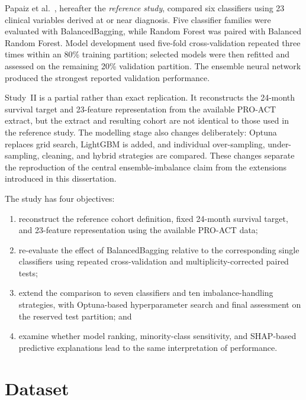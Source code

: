 Papaiz et al.~\cite{Papaiz2024}, hereafter the \emph{reference study}, compared six classifiers using 23 clinical variables derived at or near diagnosis.
Five classifier families were evaluated with BalancedBagging, while Random Forest was paired with Balanced Random Forest.
Model development used five-fold cross-validation repeated three times within an 80\% training partition; selected models were then refitted and assessed on the remaining 20\% validation partition.
The ensemble neural network produced the strongest reported validation performance.

Study~II is a partial rather than exact replication.
It reconstructs the 24-month survival target and 23-feature representation from the available \gls{PRO-ACT} extract, but the extract and resulting cohort are not identical to those used in the reference study.
The modelling stage also changes deliberately: Optuna replaces grid search, LightGBM is added, and individual over-sampling, under-sampling, cleaning, and hybrid strategies are compared.
These changes separate the reproduction of the central ensemble-imbalance claim from the extensions introduced in this dissertation.

The study has four objectives:
\begin{enumerate}
  \item reconstruct the reference cohort definition, fixed 24-month survival target, and 23-feature representation using the available \gls{PRO-ACT} data;
  \item re-evaluate the effect of BalancedBagging relative to the corresponding single classifiers using repeated cross-validation and multiplicity-corrected paired tests;
  \item extend the comparison to seven classifiers and ten imbalance-handling strategies, with Optuna-based hyperparameter search and final assessment on the reserved test partition; and
  \item examine whether model ranking, minority-class sensitivity, and SHAP-based predictive explanations lead to the same interpretation of performance.
\end{enumerate}

\section{Dataset}
\label{sec:s2_dataset}

